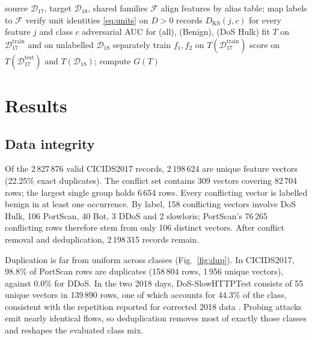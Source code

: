 \documentclass[conference]{IEEEtran}
\begin{document}
\begin{algorithm}[t]
\caption{Shift diagnosis and label-free mitigation}
\label{alg:shift}
\begin{algorithmic}[1]
\Require source $\mathcal{D}_{17}$, target $\mathcal{D}_{18}$, shared families $\mathcal{F}$
\State align features by alias table; map labels to $\mathcal{F}$
  \State verify unit identities \eqref{eq:units} on $D>0$ records
\EndFor
\State $D_{\mathrm{KS}}(j,c)$ for every feature $j$ and class $c$
\State adversarial AUC for (all), (Benign), (DoS Hulk)
  \State fit $T$ on $\mathcal{D}_{17}^{\mathrm{train}}$ and on unlabelled $\mathcal{D}_{18}$ separately
  \State train $f_1,f_2$ on $T(\mathcal{D}_{17}^{\mathrm{train}})$
  \State score on $T(\mathcal{D}_{17}^{\mathrm{test}})$ and $T(\mathcal{D}_{18})$; compute $G(T)$
\EndFor
\end{algorithmic}
\end{algorithm}

\section{Results}

\subsection{Data integrity}
\label{sec:integrity}

Of the 2\,827\,876 valid CICIDS2017 records, 2\,198\,624 are unique feature vectors (22.25\% exact duplicates). The conflict set contains 309 vectors covering 82\,704 rows; the largest single group holds 6\,654 rows. Every conflicting vector is labelled benign in at least one occurrence. By label, 158 conflicting vectors involve DoS Hulk, 106 PortScan, 40 Bot, 3 DDoS and 2 slowloris; PortScan's 76\,265 conflicting rows therefore stem from only 106 distinct vectors. After conflict removal and deduplication, 2\,198\,315 records remain.

Duplication is far from uniform across classes (Fig.~\ref{fig:dup}). In CICIDS2017, 98.8\% of PortScan rows are duplicates (158\,804 rows, 1\,956 unique vectors), against 0.0\% for DDoS. In the two 2018 days, DoS-SlowHTTPTest consists of 55 unique vectors in 139\,890 rows, one of which accounts for 44.3\% of the class, consistent with the repetition reported for corrected 2018 data \cite{cantone2024}. Probing attacks emit nearly identical flows, so deduplication removes most of exactly those classes and reshapes the evaluated class mix.
\end{document}
